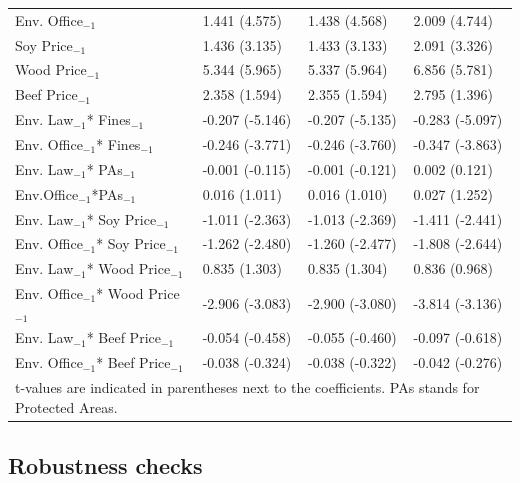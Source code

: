 \begin{table}[htpb!]
\begin{tabularx}{0.8\textwidth}{l XXX}
    Env. Office$_{-1}$&  1.441 (4.575) & 1.438 (4.568) & 2.009 (4.744)\\
    Soy Price$_{-1}$&  1.436 (3.135) & 1.433 (3.133) & 2.091 (3.326)\\
    Wood Price$_{-1}$&  5.344 (5.965) & 5.337 (5.964) & 6.856 (5.781)\\
    Beef Price$_{-1}$&  2.358 (1.594) & 2.355 (1.594) & 2.795 (1.396)\\
    Env. Law$_{-1}$* Fines$_{-1}$& -0.207 (-5.146) & -0.207 (-5.135) & -0.283 (-5.097) \\
    Env. Office$_{-1}$* Fines$_{-1}$	&  -0.246 (-3.771) & -0.246 (-3.760) & -0.347 (-3.863)\\
    Env. Law$_{-1}$* PAs$_{-1}$	& -0.001 (-0.115) & -0.001 (-0.121) & 0.002 (0.121) \\
    Env.Office$_{-1}$*PAs$_{-1}$ & 0.016 (1.011) & 0.016 (1.010) & 0.027 (1.252)\\
    Env. Law$_{-1}$* Soy Price$_{-1}$ & -1.011 (-2.363) & -1.013 (-2.369) & -1.411 (-2.441)\\
    Env. Office$_{-1}$* Soy Price$_{-1}$&  -1.262 (-2.480) & -1.260 (-2.477) & -1.808 (-2.644)\\
    Env. Law$_{-1}$* Wood Price$_{-1}$&  0.835 (1.303) & 0.835 (1.304) & 0.836 (0.968)\\
    Env. Office$_{-1}$* Wood Price$_{-1}$& -2.906 (-3.083) &  -2.900 (-3.080) & -3.814 (-3.136)\\
    Env. Law$_{-1}$* Beef Price$_{-1}$ & -0.054 (-0.458) & -0.055 (-0.460) & -0.097 (-0.618)\\
    Env. Office$_{-1}$* Beef Price$_{-1}$ & -0.038 (-0.324) & -0.038 (-0.322) & -0.042 (-0.276)\\
    \hline
	\hline
    \multicolumn{4}{l}{t-values are indicated in parentheses next to the coefficients. PAs stands for Protected Areas.}\\
   \end{tabularx}%
  \label{tab:spatialW}%
\end{table}%

\subsection{Robustness checks}
\label{SS:4.3}

